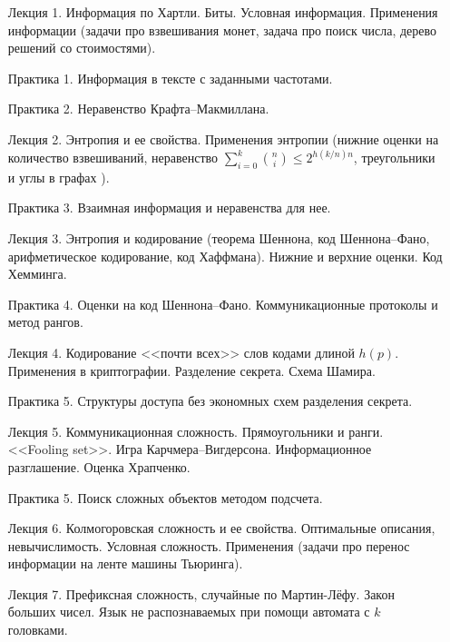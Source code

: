 \begin{enumerate}
    \item[Лекция 1.] Информация по Хартли. Биты. Условная информация. Применения информации (задачи про
        взвешивания монет, задача про поиск числа, дерево решений со стоимостями).
    \item[Практика 1.] Информация в тексте с заданными частотами.
    \item[Практика 2.] Неравенство Крафта--Макмиллана.
    \item[Лекция 2.] Энтропия и ее свойства. Применения энтропии (нижние оценки на количество
        взвешиваний, неравенство $\sum\limits_{i = 0}^{k} \binom{n}{i} \le 2^{h(k / n) n}$, треугольники
        и углы в графах \cite{KR11}).
    \item[Практика 3.] Взаимная информация и неравенства для нее.
    \item[Лекция 3.] Энтропия и кодирование (теорема Шеннона, код Шеннона--Фано, арифметическое
        кодирование, код Хаффмана). Нижние и верхние оценки. Код Хемминга.
    \item[Практика 4.] Оценки на код Шеннона--Фано. Коммуникационные протоколы и метод рангов.
    \item[Лекция 4.] Кодирование <<почти всех>> слов кодами длиной $h(p)$. Применения в
        криптографии. Разделение секрета. Схема Шамира.
    \item[Практика 5.] Структуры доступа без экономных схем разделения секрета.
    \item[Лекция 5.] Коммуникационная сложность. Прямоугольники и ранги. <<Fooling set>>. Игра
        Карчмера--Вигдерсона. Информационное разглашение. Оценка Храпченко.
    \item[Практика 5.] Поиск сложных объектов методом подсчета.
    \item[Лекция 6.] Колмогоровская сложность и ее свойства. Оптимальные описания,
        невычислимость. Условная сложность. Применения (задачи про перенос информации на ленте машины
        Тьюринга).
    \item[Лекция 7.] Префиксная сложность, случайные по Мартин-Лёфу. Закон больших чисел. Язык не
        распознаваемых при помощи автомата с $k$ головками.
\end{enumerate}